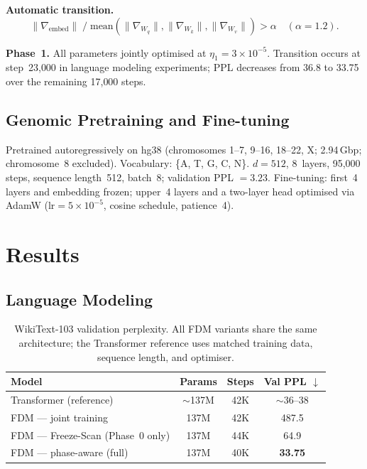 \documentclass{article}
\begin{document}
\textbf{Automatic transition.}
\begin{equation}
  \|\nabla_\mathrm{embed}\| \;/\;
  \mathrm{mean}\!\left(
    \|\nabla_{W_q}\|, \|\nabla_{W_k}\|, \|\nabla_{W_v}\|\right)
  > \alpha \quad (\alpha = 1.2).
\end{equation}

\textbf{Phase~1.}
All parameters jointly optimised at $\eta_1 = 3 \times 10^{-5}$.
Transition occurs at step~23{,}000 in language modeling experiments;
PPL decreases from 36.8 to 33.75 over the remaining 17{,}000 steps.

\subsection{Genomic Pretraining and Fine-tuning}

Pretrained autoregressively on hg38 (chromosomes 1--7, 9--16, 18--22, X;
2.94\,Gbp; chromosome~8 excluded).
Vocabulary: \{A, T, G, C, N\}.
$d = 512$, 8~layers, 95{,}000 steps, sequence length~512, batch~8;
validation PPL $= 3.23$.
Fine-tuning: first~4 layers and embedding frozen; upper~4 layers and a
two-layer head optimised via AdamW ($\mathrm{lr} = 5 \times 10^{-5}$,
cosine schedule, patience~4).

\section{Results}

\subsection{Language Modeling}

\begin{table}[h]
\centering
\caption{WikiText-103 validation perplexity. All FDM variants share
the same architecture; the Transformer reference uses matched training
data, sequence length, and optimiser.}
\label{tab:lm}
\begin{tabular}{lccc}
\toprule
Model & Params & Steps & Val PPL $\downarrow$ \\
\midrule
Transformer (reference) & $\sim$137M & 42K & $\sim$36--38 \\
FDM --- joint training  & 137M & 42K & 487.5 \\
FDM --- Freeze-Scan (Phase~0 only) & 137M & 44K & 64.9 \\
FDM --- phase-aware (full) & 137M & 40K & \textbf{33.75} \\
\bottomrule
\end{tabular}
\end{table}
\end{document}
